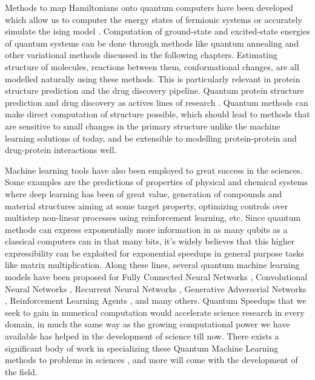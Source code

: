 Methods to map Hamiltonians onto quantum computers have been developed which allow us to computer the energy states of fermionic systems or accurately simulate the ising model \cite{qmap-jordan-wigner,qmap-bravyi-kitaev,qmap-jordan-wigner-nielsen,qmap-bravyi-kitaev-electronic-structure-simulation,qmap-comparative-bravyi-jordan}. Computation of ground-state and excited-state energies \cite{guzik-molecular-energy} of quantum systems can be done through methods like quantum annealing \cite{quantum-annealing} and other variational methods discussed in the following chapters. Estimating structure of molecules, reactions between them, conformational changes, are all modelled naturally using these methods. This is particularly relevant in protein structure prediction and the drug discovery pipeline. Quantum protein structure prediction \cite{qpf-simulating-chemistry,qpf-resource-efficient-algo} and drug discovery as actives lines of research \cite{qdd-drug-discovery-potential,qdd-drug-discovery-industry}. Quantum methods can make direct computation of structure possible, which should lead to methods that are sensitive to small changes in the primary structure unlike the machine learning solutions of today, and be extensible to modelling protein-protein and drug-protein interactions well.

Machine learning tools have also been employed to great success in the sciences. Some examples are the predictions of properties of physical and chemical systems where deep learning has been of great value, generation of compounds and material structures aiming at some target property, optimizing controls over multistep non-linear processes using reinforcement learning, etc. Since quantum methods can express exponentially more information in as many qubits as a classical computers can in that many bits, it's widely believes that this higher expressibility can be exploited for exponential speedups in general purpose tasks like matrix multiplication. Along these lines, several quantum machine learning models have been proposed for Fully Connected Neural Networks \cite{qml-nn}, Convolutional Neural Networks \cite{qml-cnn}, Recurrent Neural Networks \cite{qml-rnn}, Generative Adverserial Networks \cite{qml-gan}, Reinforcement Learning Agents \cite{qml-rl,future-vqe-for-deep-rl}, and many others. Quantum Speedups that we seek to gain in numerical computation would accelerate science research in every domain, in much the same way as the growing computational power we have available has helped in the development of science till now. There exists a significant body of work in specializing these Quantum Machine Learning methods to problems in sciences \cite{qmldd-drug-discovery-generative,qmldd-drug-discovery-qml,qmldd-drug-discovery-using-qml}, and more will come with the development of the field.

